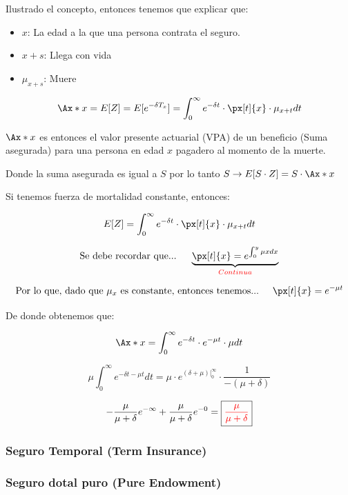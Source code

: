 \documentclass[12pt, a4paper, footinclude=true]{scrbook}
\begin{document}
Ilustrado el concepto, entonces tenemos que explicar que: 

\begin{itemize}
	\item $x$: La edad a la que una persona contrata el seguro. 
	\item $x+s$: Llega con vida
	\item $\mu_{x+s}$: Muere
\end{itemize}

\[
	\Ax*{x} = E[Z] = E[e^{-\delta T_x}] = \int_{0}^{\infty} e^{-\delta t} \cdot \px[t]{x} \cdot \mu_{x+t} dt
\]

$\Ax*{x}$ es entonces el valor presente actuarial (VPA) de un beneficio (Suma asegurada) para una persona en edad $x$ pagadero al momento de la muerte. 

Donde la suma asegurada es igual a $S$ por lo tanto $S \rightarrow E[S \cdot Z] = S \cdot \Ax*{x}$

{\color{red} Si tenemos fuerza de mortalidad constante, entonces:}

\[
	E[Z] = \int_{0}^{\infty} e^{-\delta t} \cdot \px[t]{x} \cdot \mu_{x+t} dt \\ 
\]

\[
	\text{Se debe recordar que...} \hspace{0.5cm} \underbrace{\px[t]{x} = e^{\int_{0}^{y} \mu x dx}}_{\color{red}Continua}
\]		

\[
	\text{Por lo que, dado que $\mu_x$ es constante, entonces tenemos...} \hspace{0.5cm} \px[t]{x} = e^{-\mu t}
\]

De donde obtenemos que: 

\[
	\Ax*{x} = \int_{0}^{\infty} e^{-\delta t} \cdot e^{-\mu t} \cdot \mu dt
\]

\[
	\mu \int_{0}^{\infty} e^{-\delta t - \mu t} dt = \mu \cdot e^{(\delta + \mu) |_{0}^{\infty}} \cdot \frac{1}{-(\mu + \delta)}
\]

\[
	-\frac{\mu}{\mu + \delta} e^{- \infty} + \frac{\mu}{\mu + \delta} e^{-0} = \boxed{\color{red} \frac{\mu}{\mu + \delta}}
\]

\subsubsection{Seguro Temporal (Term Insurance)}

\subsubsection{Seguro dotal puro (Pure Endowment)}
\end{document}
